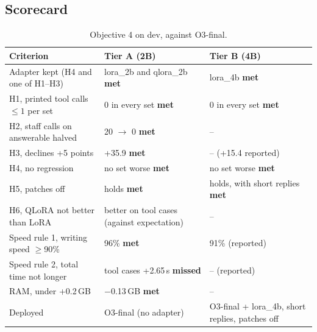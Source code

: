 \documentclass[11pt,a4paper]{article}
\newcommand{\met}{\textcolor{qaqua}{\textbf{met}}}
\newcommand{\missed}{\textcolor{qred}{\textbf{missed}}}
\begin{document}
\subsection{Scorecard}
\begin{table}[H]
\centering\small
\caption{Objective 4 on dev, against O3-final.}\label{tab:score}
\begin{tabularx}{\textwidth}{L p{3.6cm} p{3.6cm}}
\toprule
Criterion & Tier A (2B) & Tier B (4B) \\
\midrule
Adapter kept (H4 and one of H1--H3) & lora\_2b and qlora\_2b \met & lora\_4b \met \\
H1, printed tool calls $\le 1$ per set & 0 in every set \met & 0 in every set \met \\
H2, staff calls on answerable halved & 20 $\to$ 0 \met & -- \\
H3, declines +5 points & +35.9 \met & -- (+15.4 reported) \\
H4, no regression & no set worse \met & no set worse \met \\
H5, patches off & holds \met & holds, with short replies \met \\
H6, QLoRA not better than LoRA & better on tool cases (against expectation) & -- \\
Speed rule 1, writing speed $\ge$90\% & 96\% \met & 91\% (reported) \\
Speed rule 2, total time not longer & tool cases +2.65\,s \missed & -- (reported) \\
RAM, under +0.2\,GB & $-$0.13\,GB \met & -- \\
\midrule
Deployed & O3-final (no adapter) & O3-final + lora\_4b, short replies, patches off \\
\bottomrule
\end{tabularx}
\end{table}

\end{document}
